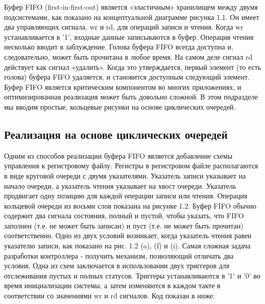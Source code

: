 Буфер FIFO (first-in-first-out) является «эластичным» хранилищем между двумя подсистемами, как показано на концептуальной диаграмме рисунка 1.1.  Он имеет два управляющих сигнала, wr и rd, для операций записи и чтения. Когда wr устанавливается в '1', входные данные записываются в буфер. Операция чтения несколько вводит в заблуждение. Голова буфера FIFO всегда доступна и, следовательно, может быть прочитана в любое время. На самом деле сигнал rd действует как сигнал «удалить». Когда это утверждается, первый элемент (то есть голова) буфера FIFO удаляется, и становится доступным следующий элемент. Буфер FIFO является критическим компонентом во многих приложениях, и оптимизированная реализация может быть довольно сложной. В этом подразделе мы вводим простые,  кольцевые рисунки на основе циклических очередей.

\subsection{Реализация на основе циклических очередей}
Одним из способов реализации буфера FIFO является добавление схемы управления к регистровому файлу. Регистры в регистровом файле располагаются в виде круговой очереди с двумя указателями. Указатель записи указывает на начало очереди, а указатель чтения указывает на хвост очереди. Указатель продвигает одну позицию для каждой операции записи или чтения. Операция кольцевой очереди из восьми слов показана на рисунке 1.2.
	Буфер FIFO обычно содержит два сигнала состояния, полный и пустой, чтобы указать, что FIFO заполнен (т.е. не может быть записан) и пуст (т.е. не может быть прочитан) соответственно. Одно из двух условий возникает, когда указатель чтения равен указателю записи, как показано на рис. 1.2 (a), (f) и (i). Самая сложная задача разработки контроллера - получить механизм, позволяющий отличать два условия. Одна из схем заключается в использовании двух триггеров  для отслеживания пустых и полных статусов. Триггеры устанавливаются в '1' и '0' во время инициализации системы, а затем изменяются в каждом такте в соответствии со значениями wr и rd сигналов. Код показан в ниже:

